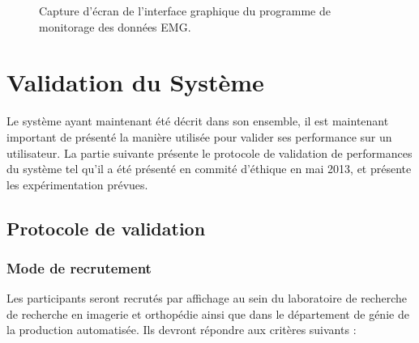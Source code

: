 \documentclass[letterpaper, twoside, 12pt, memoire, creativecommons, hyperref]{thETS}
\begin{document}
\begin{figure}
	\centering
	\caption{Capture d'écran de l'interface graphique du programme de monitorage des données EMG.}
	\label{fig:gui3}
\end{figure}


\section{Validation du Système}

Le système ayant maintenant été décrit dans son ensemble, il est maintenant important de présenté la manière utilisée pour valider ses performance sur un utilisateur. La partie suivante présente le protocole de validation de performances du système tel qu'il a été présenté en commité d'éthique en mai 2013, et présente les expérimentation prévues.

\subsection{Protocole de validation}

\subsubsection{Mode de recrutement} 

Les participants seront recrutés par affichage au sein du laboratoire de recherche de recherche en imagerie et orthopédie ainsi que dans le département de génie de la production automatisée. Ils devront répondre aux critères suivants : 
\end{document}
